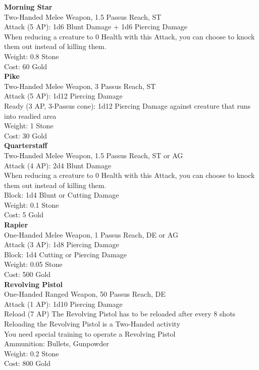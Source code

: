 \textbf{Morning Star}\\
Two-Handed Melee Weapon, 1.5 Passus Reach, ST\\
Attack (5 AP): 1d6 Blunt Damage + 1d6 Piercing Damage\\
When reducing a creature to 0 Health with this Attack, you can choose to knock them out instead of killing them.\\
Weight: 0.8 Stone\\
Cost: 60 Gold\\


\textbf{Pike}\\
Two-Handed Melee Weapon, 3 Passus Reach, ST\\
Attack (5 AP): 1d12 Piercing Damage\\
Ready (3 AP, 3-Passus cone): 1d12 Piercing Damage against creature that runs into readied area\\
Weight: 1 Stone\\
Cost: 30 Gold\\


\textbf{Quarterstaff}\\
Two-Handed Melee Weapon, 1.5 Passus Reach, ST or AG\\
Attack (4 AP): 2d4 Blunt Damage\\
When reducing a creature to 0 Health with this Attack, you can choose to knock them out instead of killing them.\\
Block: 1d4 Blunt or Cutting Damage\\
Weight: 0.1 Stone\\
Cost: 5 Gold\\


\textbf{Rapier}\\
One-Handed Melee Weapon, 1 Passus Reach, DE or AG\\
Attack (3 AP): 1d8 Piercing Damage\\
Block: 1d4 Cutting or Piercing Damage\\
Weight: 0.05 Stone\\
Cost: 500 Gold\\


\textbf{Revolving Pistol}\\
One-Handed Ranged Weapon, 50 Passus Reach, DE\\
Attack (1 AP): 1d10 Piercing Damage\\
Reload (7 AP) The Revolving Pistol has to be reloaded after every 8 shots\\
Reloading the Revolving Pistol is a Two-Handed activity\\
You need special training to operate a Revolving Pistol\\
Ammunition: Bullets, Gunpowder\\
Weight: 0.2 Stone\\
Cost: 800 Gold\\


